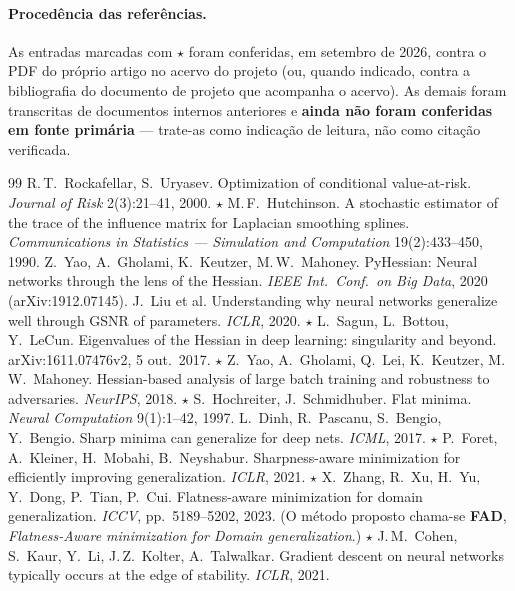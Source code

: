 \paragraph{Procedência das referências.} As entradas marcadas com $\star$ foram conferidas, em setembro de 2026, contra o PDF do próprio artigo no acervo do projeto (ou, quando indicado, contra a bibliografia do documento de projeto que acompanha o acervo). As demais foram transcritas de documentos internos anteriores e \textbf{ainda não foram conferidas em fonte primária} --- trate-as como indicação de leitura, não como citação verificada.

\begin{thebibliography}{99}\small
{} R.\,T.\ Rockafellar, S.\ Uryasev. Optimization of conditional value-at-risk. \emph{Journal of Risk} 2(3):21--41, 2000.
 $\star$ M.\,F.\ Hutchinson. A stochastic estimator of the trace of the influence matrix for Laplacian smoothing splines. \emph{Communications in Statistics --- Simulation and Computation} 19(2):433--450, 1990.
 Z.\ Yao, A.\ Gholami, K.\ Keutzer, M.\,W.\ Mahoney. PyHessian: Neural networks through the lens of the Hessian. \emph{IEEE Int.\ Conf.\ on Big Data}, 2020 (arXiv:1912.07145).
 J.\ Liu et al. Understanding why neural networks generalize well through GSNR of parameters. \emph{ICLR}, 2020.
 $\star$ L.\ Sagun, L.\ Bottou, Y.\ LeCun. Eigenvalues of the Hessian in deep learning: singularity and beyond. arXiv:1611.07476v2, 5 out.\ 2017.
 $\star$ Z.\ Yao, A.\ Gholami, Q.\ Lei, K.\ Keutzer, M.\,W.\ Mahoney. Hessian-based analysis of large batch training and robustness to adversaries. \emph{NeurIPS}, 2018.
 $\star$ S.\ Hochreiter, J.\ Schmidhuber. Flat minima. \emph{Neural Computation} 9(1):1--42, 1997.
 L.\ Dinh, R.\ Pascanu, S.\ Bengio, Y.\ Bengio. Sharp minima can generalize for deep nets. \emph{ICML}, 2017.
 $\star$ P.\ Foret, A.\ Kleiner, H.\ Mobahi, B.\ Neyshabur. Sharpness-aware minimization for efficiently improving generalization. \emph{ICLR}, 2021.
 $\star$ X.\ Zhang, R.\ Xu, H.\ Yu, Y.\ Dong, P.\ Tian, P.\ Cui. Flatness-aware minimization for domain generalization. \emph{ICCV}, pp.\ 5189--5202, 2023. (O método proposto chama-se \textbf{FAD}, \emph{Flatness-Aware minimization for Domain generalization}.)
 $\star$ J.\,M.\ Cohen, S.\ Kaur, Y.\ Li, J.\,Z.\ Kolter, A.\ Talwalkar. Gradient descent on neural networks typically occurs at the edge of stability. \emph{ICLR}, 2021.

\end{thebibliography}
